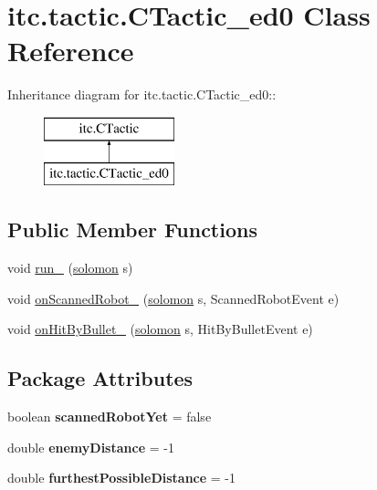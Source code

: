 \hypertarget{classitc_1_1tactic_1_1_c_tactic__ed0}{
\section{itc.tactic.CTactic\_\-ed0 Class Reference}
\label{classitc_1_1tactic_1_1_c_tactic__ed0}
}
Inheritance diagram for itc.tactic.CTactic\_\-ed0::\begin{figure}[H]
\begin{center}
\leavevmode
\includegraphics[height=2cm]{classitc_1_1tactic_1_1_c_tactic__ed0}
\end{center}
\end{figure}
\subsection*{Public Member Functions}
\begin{DoxyCompactItemize}
\item 
void \hyperlink{classitc_1_1tactic_1_1_c_tactic__ed0_aa8db38d3d879327bb337138a8f42a069}{run\_\-} (\hyperlink{classitc_1_1solomon}{solomon} s)
\item 
void \hyperlink{classitc_1_1tactic_1_1_c_tactic__ed0_aa1b6857853a2bc90fcf4309b39a3907a}{onScannedRobot\_\-} (\hyperlink{classitc_1_1solomon}{solomon} s, ScannedRobotEvent e)
\item 
void \hyperlink{classitc_1_1tactic_1_1_c_tactic__ed0_ad04cdcbec1998d1c7bee55a9dc959505}{onHitByBullet\_\-} (\hyperlink{classitc_1_1solomon}{solomon} s, HitByBulletEvent e)
\end{DoxyCompactItemize}
\subsection*{Package Attributes}
\begin{DoxyCompactItemize}
\item 
\hypertarget{classitc_1_1tactic_1_1_c_tactic__ed0_a34362d0142747b753729bfe67ae9b7e9}{
boolean {\bfseries scannedRobotYet} = false}
\label{classitc_1_1tactic_1_1_c_tactic__ed0_a34362d0142747b753729bfe67ae9b7e9}

\item 
\hypertarget{classitc_1_1tactic_1_1_c_tactic__ed0_aa35faecdb387aa9b98ff7ee2177919c0}{
double {\bfseries enemyDistance} = -\/1}
\label{classitc_1_1tactic_1_1_c_tactic__ed0_aa35faecdb387aa9b98ff7ee2177919c0}

\item 
\hypertarget{classitc_1_1tactic_1_1_c_tactic__ed0_ad16009212997fe1ba06e045c97483920}{
double {\bfseries furthestPossibleDistance} = -\/1}
\label{classitc_1_1tactic_1_1_c_tactic__ed0_ad16009212997fe1ba06e045c97483920}

\end{DoxyCompactItemize}


